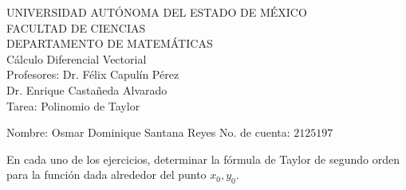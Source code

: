 \documentclass[fleqn, 12pt]{article}
\begin{document}
    \begin{center}
        UNIVERSIDAD AUTÓNOMA DEL ESTADO DE MÉXICO \\
        FACULTAD DE CIENCIAS \\
        DEPARTAMENTO DE MATEMÁTICAS \\
        Cálculo Diferencial Vectorial \\
        Profesores: Dr. Félix Capulín Pérez \\
        Dr. Enrique Castañeda Alvarado \\
        Tarea: Polinomio de Taylor
    \end{center}

    Nombre: Osmar Dominique Santana Reyes \hfill No. de cuenta: $ 2125197 $

    En cada uno de los ejercicios, determinar la fórmula de Taylor de segundo orden para la función dada alrededor del punto $ x_0, y_0 $.
\end{document}

